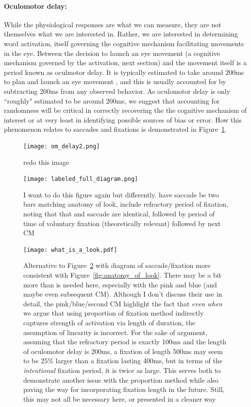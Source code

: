 \paragraph{Oculomotor delay:} While the physiological responses are what we can measure, they are not themselves what we are interested in. Rather, we are interested in determining word activation, itself governing the cognitive mechanism facilitating movements in the eye. Between the decision to launch an eye movement (a cognitive mechanism governed by the activation, next section) and the movement itself is a period known as oculmotor delay. It is typically estimated to take around 200ms to plan and launch an eye movement \cite{viviani1990time}, and this is usually accounted for by subtracting 200ms from any observed behavior. As oculomotor delay is only ``roughly" estimated to be around 200ms, we suggest that accounting for randomness will be critical in correctly recovering the the cognitive mechanism of interest or at very least in identifying possible sources of bias or error. How this phenomenon relates to saccades and fixations is demonstrated in Figure~\ref{fig:sac_fix_look_om}.


\begin{figure}[H]
\centering
\texttt{[image: om\_delay2.png]}
\caption{redo this image}
\label{fig:sac_fix_look_om}
\end{figure}


\begin{figure}
\centering
\texttt{[image: labeled\_full\_diagram.png]}
\caption{I want to do this figure again but differently. have saccade be  two bars matching anatomy of look, include refractory period of fixation, noting that that and saccade are identical, followed by period of time of voluntary fixation (theoretically relevant) followed by next CM}
\label{fig:full_diagram_looks}
\end{figure}

\begin{figure}
\centering
\texttt{[image: what\_is\_a\_look.pdf]}
\caption{Alternative to Figure~\ref{fig:full_diagram_looks} with diagram of saccade/fixation more consistent with Figure~\ref{fig:anatomy_of_look}. There may be a bit more than is needed here, especially with the pink and blue (and maybe even subsequent CM). Although I don't discuss their use in detail, the pink/blue/second CM highlight the fact that \textit{even when} we argue that using proportion of fixation method indirectly captures strength of activation via length of duration, the assumption of linearity is incorrect. For the sake of argument, assuming that the refractory period is exactly 100ms and the length of oculomotor delay is 200ms, a fixation of length 500ms may seem to be 25\% larger than a fixation lasting 400ms, but in terms of the \textit{intentional} fixation period, it is twice as large. This serves both to demonstrate another issue with the proportion method while also paving the way for incorporating fixation length in the future. Still, this may not all be necessary here, or presented in a cleaner way} 
\label{fig:whats_in_a_look}
\end{figure}

